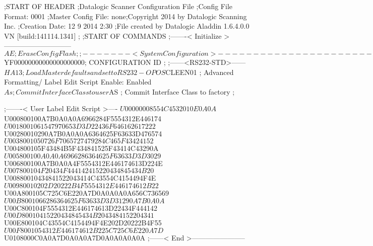 ;START OF HEADER
;Datalogic Scanner Configuration File
;Config File Format: 0001
;Master Config File: none;Copyright 2014 by Datalogic Scanning Inc.
;Creation Date: 12 9 2014 2:30
;File created by Datalogic Aladdin 1.6.4.0.0 VN [build:141114.1341]
;
;START OF COMMANDS
;-------< Initialize >-----------------------------
$AE                 ; Erase Config Flash
;
;-------< System Configuration >-------------------------------
$YF00000000000000000000; CONFIGURATION ID
;
;------<RS232-STD>------
$HA13               ; Load Master defaults and set to RS232-OPOS
$CLEEN01            ; Advanced Formatting/ Label Edit Script Enable: Enabled
$As                 ; Commit Interface Class to user
$AS                 ; Commit Interface Class to factory
;

;-------< User Label Edit Script >----
$U00000008554C4532010E0A0A
$U000800100A7B0A0A0A6966284F5554312E446174
$U0018001061547970653D3D22436F646162617222
$U00280010290A7B0A0A0A6364625F63633D476574
$U0038001050726F7065727479284C465F43424152
$U004800105F43484B5F434841525F43414C43290A
$U005800100A0A0A6966286364625F63633D3D3029
$U006800100A7B0A0A4F5554312E446174613D224E
$U007800104F20434F444142415220434845434B20
$U00880010434841522043414C43554C4154494F4E
$U00980010202D20222B4F5554312E446174612B22
$U00A800105C725C6E220A7D0A0A0A0A656C736569
$U00B8001066286364625F63633D3D31290A7B0A0A
$U00C800104F5554312E446174613D22434F444142
$U00D80010415220434845434B2043484152204341
$U00E800104C43554C4154494F4E202D20222B4F55
$U00F8001054312E446174612B225C725C6E220A7D
$U0108000C0A0A7D0A0A0A7D0A0A0A0A0A
;------< End >-----------------------
